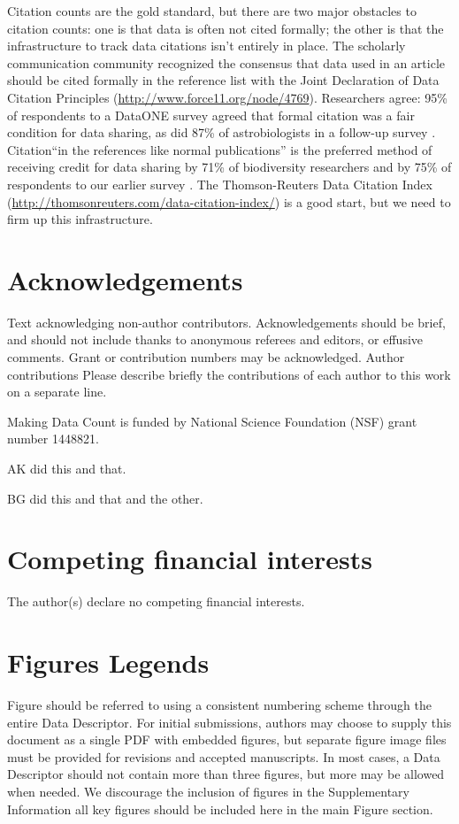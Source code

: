 \documentclass[english]{article}
\begin{document}
Citation counts are the gold standard, but there are two major obstacles to citation counts: one is that data is often not cited formally; the other is that the infrastructure to track data citations isn't entirely in place.
The scholarly communication community recognized the consensus that data used in an article should be cited formally in the reference list with the Joint Declaration of Data Citation Principles (\url{http://www.force11.org/node/4769}). 
Researchers agree: 95\% of respondents to a DataONE survey agreed that formal citation was a fair condition for data sharing, as did 87\% of astrobiologists in a follow-up survey \cite{@tenopir_data_2011, @aydinoglu_data_2014}. 
Citation``in the references like normal publications'' is the preferred method of receiving credit for data sharing by 71\% of biodiversity researchers and by 75\% of respondents to our earlier survey \cite{@enke_users_2012, @kratz_researcher_2015}.
The Thomson-Reuters Data Citation Index (\url{http://thomsonreuters.com/data-citation-index/}) is a good start, but we need to firm up this infrastructure.


\section*{Acknowledgements}


Text acknowledging non-author contributors. Acknowledgements should
be brief, and should not include thanks to anonymous referees and
editors, or effusive comments. Grant or contribution numbers may be
acknowledged. Author contributions Please describe briefly the contributions
of each author to this work on a separate line. 

Making Data Count is funded by National Science Foundation (NSF) grant number 1448821.

AK did this and that. 

BG did this and that and the other. 


\section*{Competing financial interests}


The author(s) declare no competing financial interests.


\section*{Figures Legends}

Figure should be referred to using a consistent numbering scheme through
the entire Data Descriptor. For initial submissions, authors may choose
to supply this document as a single PDF with embedded figures, but
separate figure image files must be provided for revisions and accepted
manuscripts. In most cases, a Data Descriptor should not contain more
than three figures, but more may be allowed when needed. We discourage
the inclusion of figures in the Supplementary Information \textendash{}
all key figures should be included here in the main Figure section. 
\end{document}
